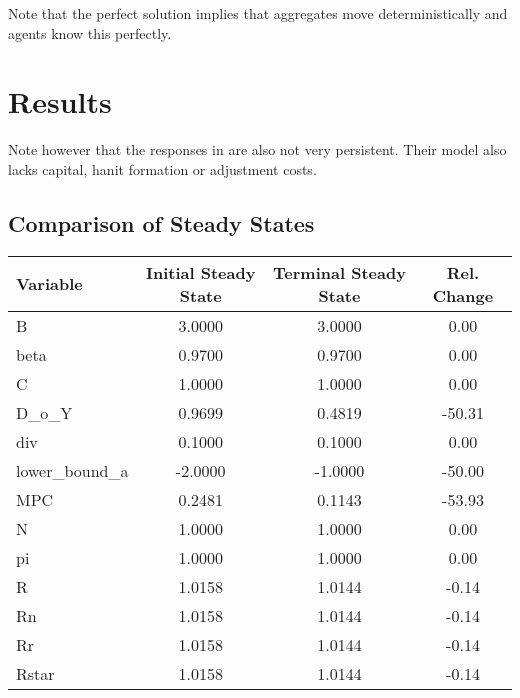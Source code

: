 \documentclass[12pt]{article} %
\numberwithin{equation}{section} %
\begin{document}
Note that the perfect solution implies that aggregates move deterministically and agents know this perfectly.

\section{Results}
\label{sec:results}

Note however that the responses in \textcite{gl2017} are also not very persistent. Their model also lacks capital, hanit formation or adjustment costs.

\subsection{Comparison of Steady States}
\label{sec:results-stst}

\begin{center}
\begin{tabular}{lccc}
     Variable &  Initial Steady State &  Terminal Steady State &  Rel. Change \\
     \hline
            B &                3.0000 &                 3.0000 &         0.00 \\
         beta &                0.9700 &                 0.9700 &         0.00 \\
            C &                1.0000 &                 1.0000 &         0.00 \\
        D\_o\_Y &                0.9699 &                 0.4819 &       -50.31 \\
          div &                0.1000 &                 0.1000 &         0.00 \\
lower\_bound\_a &               -2.0000 &                -1.0000 &       -50.00 \\
          MPC &                0.2481 &                 0.1143 &       -53.93 \\
            N &                1.0000 &                 1.0000 &         0.00 \\
           pi &                1.0000 &                 1.0000 &         0.00 \\
            R &                1.0158 &                 1.0144 &        -0.14 \\
           Rn &                1.0158 &                 1.0144 &        -0.14 \\
           Rr &                1.0158 &                 1.0144 &        -0.14 \\
        Rstar &                1.0158 &                 1.0144 &        -0.14 \\

\end{tabular}
\end{center}
\end{document}
